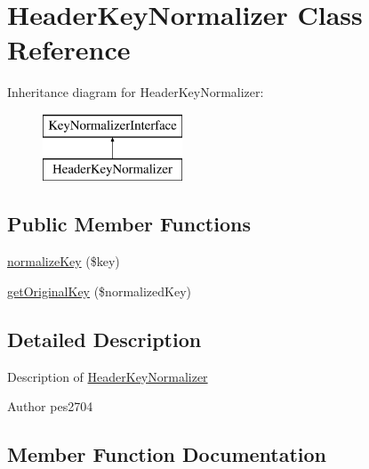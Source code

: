 \hypertarget{class_pes_1_1_http_1_1_header_key_normalizer}{}\section{Header\+Key\+Normalizer Class Reference}
\label{class_pes_1_1_http_1_1_header_key_normalizer}
Inheritance diagram for Header\+Key\+Normalizer\+:\begin{figure}[H]
\begin{center}
\leavevmode
\includegraphics[height=2.000000cm]{class_pes_1_1_http_1_1_header_key_normalizer}
\end{center}
\end{figure}
\subsection*{Public Member Functions}
\begin{DoxyCompactItemize}
\item 
\mbox{\hyperlink{class_pes_1_1_http_1_1_header_key_normalizer_af39c624090b7badef56311d62a041c50}{normalize\+Key}} (\$key)
\item 
\mbox{\hyperlink{class_pes_1_1_http_1_1_header_key_normalizer_ad96b455525cff93be0dc81b5f6a4f8b9}{get\+Original\+Key}} (\$normalized\+Key)
\end{DoxyCompactItemize}


\subsection{Detailed Description}
Description of \mbox{\hyperlink{class_pes_1_1_http_1_1_header_key_normalizer}{Header\+Key\+Normalizer}}

\begin{DoxyAuthor}{Author}
pes2704 
\end{DoxyAuthor}


\subsection{Member Function Documentation}
\mbox{\label{class_pes_1_1_http_1_1_header_key_normalizer_ad96b455525cff93be0dc81b5f6a4f8b9}} 
